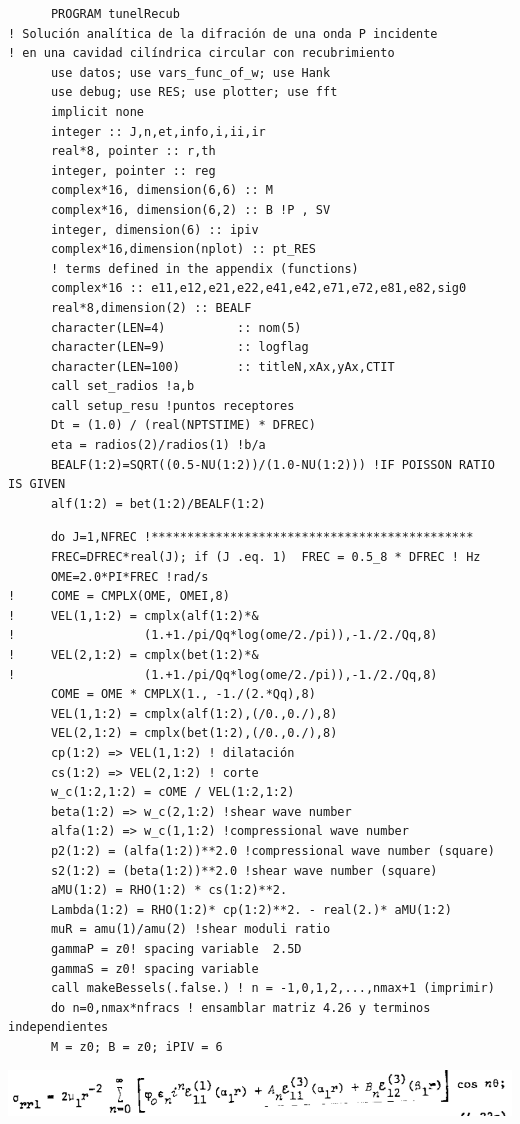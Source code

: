 \documentclass [11pt,spanish]{article}
\begin{document}
\begingroup
\fontsize{10pt}{12pt}
\selectfont
{}
\begin{shaded}
\begin{verbatim}
      PROGRAM tunelRecub
! Solución analítica de la difración de una onda P incidente 
! en una cavidad cilíndrica circular con recubrimiento
      use datos; use vars_func_of_w; use Hank
      use debug; use RES; use plotter; use fft
      implicit none
      integer :: J,n,et,info,i,ii,ir
      real*8, pointer :: r,th
      integer, pointer :: reg
      complex*16, dimension(6,6) :: M
      complex*16, dimension(6,2) :: B !P , SV
      integer, dimension(6) :: ipiv 
      complex*16,dimension(nplot) :: pt_RES
      ! terms defined in the appendix (functions)
      complex*16 :: e11,e12,e21,e22,e41,e42,e71,e72,e81,e82,sig0
      real*8,dimension(2) :: BEALF
      character(LEN=4)          :: nom(5)
      character(LEN=9)          :: logflag
      character(LEN=100)        :: titleN,xAx,yAx,CTIT
      call set_radios !a,b
      call setup_resu !puntos receptores
      Dt = (1.0) / (real(NPTSTIME) * DFREC)
      eta = radios(2)/radios(1) !b/a
      BEALF(1:2)=SQRT((0.5-NU(1:2))/(1.0-NU(1:2))) !IF POISSON RATIO IS GIVEN
      alf(1:2) = bet(1:2)/BEALF(1:2)
\end{verbatim}
\end{shaded}
\endgroup

\begingroup
\fontsize{10pt}{12pt}
\selectfont
{}
\begin{shaded}
\begin{verbatim}
      do J=1,NFREC !*********************************************
      FREC=DFREC*real(J); if (J .eq. 1)  FREC = 0.5_8 * DFREC ! Hz
      OME=2.0*PI*FREC !rad/s
!     COME = CMPLX(OME, OMEI,8)
!     VEL(1,1:2) = cmplx(alf(1:2)*& 
!                  (1.+1./pi/Qq*log(ome/2./pi)),-1./2./Qq,8)
!     VEL(2,1:2) = cmplx(bet(1:2)*& 
!                  (1.+1./pi/Qq*log(ome/2./pi)),-1./2./Qq,8)
      COME = OME * CMPLX(1., -1./(2.*Qq),8)
      VEL(1,1:2) = cmplx(alf(1:2),(/0.,0./),8)
      VEL(2,1:2) = cmplx(bet(1:2),(/0.,0./),8)
      cp(1:2) => VEL(1,1:2) ! dilatación
      cs(1:2) => VEL(2,1:2) ! corte
      w_c(1:2,1:2) = cOME / VEL(1:2,1:2) 
      beta(1:2) => w_c(2,1:2) !shear wave number
      alfa(1:2) => w_c(1,1:2) !compressional wave number
      p2(1:2) = (alfa(1:2))**2.0 !compressional wave number (square)
      s2(1:2) = (beta(1:2))**2.0 !shear wave number (square)
      aMU(1:2) = RHO(1:2) * cs(1:2)**2.
      Lambda(1:2) = RHO(1:2)* cp(1:2)**2. - real(2.)* aMU(1:2)
      muR = amu(1)/amu(2) !shear moduli ratio
      gammaP = z0! spacing variable  2.5D
      gammaS = z0! spacing variable
      call makeBessels(.false.) ! n = -1,0,1,2,...,nmax+1 (imprimir)
      do n=0,nmax*nfracs ! ensamblar matriz 4.26 y terminos independientes
      M = z0; B = z0; iPIV = 6
\end{verbatim}
\end{shaded}
\endgroup
\includegraphics[scale=0.5]{srr1}
\end{document}

